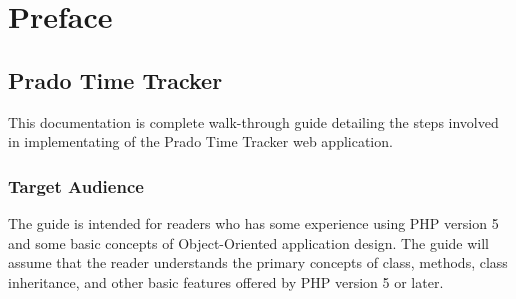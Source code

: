 \chapter*{Preface} \hypertarget{preface}{}
\section*{Prado Time Tracker}
This documentation is complete walk-through guide detailing the
steps involved in implementating of the Prado Time Tracker web application.

\subsection*{Target Audience}
The guide is intended for readers who has some experience
using PHP version 5 and some basic concepts of Object-Oriented application
design. The guide will assume that the reader understands the primary concepts
of class, methods, class inheritance, and other basic features offered by PHP
version 5 or later.